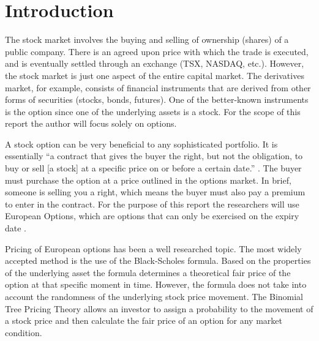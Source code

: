 \documentclass[12pt]{article}
\begin{document}



\newpage 
\doublespacing
{}
\setlength{\parindent}{1cm}

\section{Introduction}
The stock market involves the buying and selling of ownership (shares) of a public company.  There is an agreed upon price with which the trade is executed, and is eventually settled through an exchange (TSX, NASDAQ, etc.).  However, the stock market is just one aspect of the entire capital market. The derivatives market, for example, consists of financial instruments that are derived from other forms of securities (stocks, bonds, futures).  One of the better-known instruments is the option since one of the underlying assets is a stock. For the scope of this report the author will focus solely on options.

A stock option can be very beneficial to any sophisticated portfolio. It is essentially ``a contract that gives the buyer the right, but not the obligation, to buy or sell [a stock] at a specific price on or before a certain date.'' \cite{volatility}. The buyer must purchase the option at a price outlined in the options market. In brief, someone is selling you a right, which means the buyer must also pay a premium to enter in the contract. For the purpose of this report the researchers will use European Options, which are options that can only be exercised on the expiry date \cite{euro_option}. 

Pricing of European options has been a well researched topic. The most widely accepted method is the use of the Black-Scholes formula. Based on the properties of the underlying asset the formula determines a theoretical fair price of the option at that specific moment in time. However, the formula does not take into account the randomness of the underlying stock price movement. The Binomial Tree Pricing Theory allows an investor to assign a probability to the movement of a stock price and then calculate the fair price of an option for any market condition. 
\end{document}
